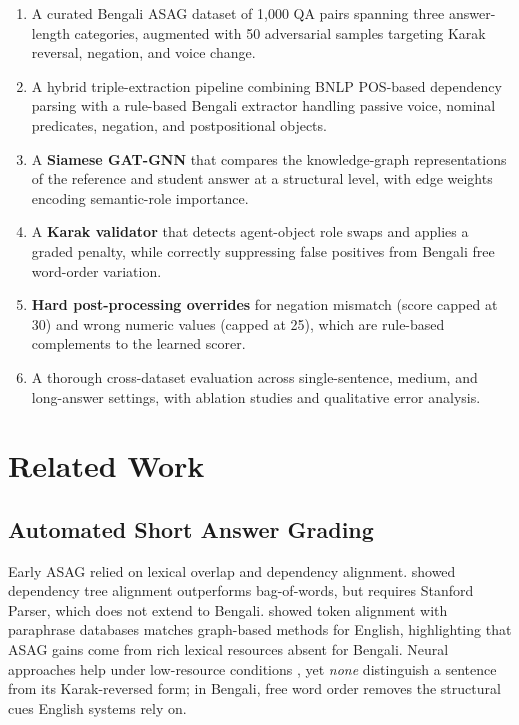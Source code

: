\documentclass[11pt]{article}
\begin{document}
\begin{enumerate}
  \item A curated Bengali ASAG dataset of 1{,}000 QA pairs spanning three answer-length categories, augmented with 50 adversarial samples targeting Karak reversal, negation, and voice change.
  \item A hybrid triple-extraction pipeline combining BNLP POS-based dependency parsing with a rule-based Bengali extractor handling passive voice, nominal predicates, negation, and postpositional objects.
  \item A \textbf{Siamese GAT-GNN} that compares the knowledge-graph representations of the reference and student answer at a structural level, with edge weights encoding semantic-role importance.
  \item A \textbf{Karak validator} that detects agent-object role swaps and applies a graded penalty, while correctly suppressing false positives from Bengali free word-order variation.
  \item \textbf{Hard post-processing overrides} for negation mismatch (score capped at 30) and wrong numeric values (capped at 25), which are rule-based complements to the learned scorer.
  \item A thorough cross-dataset evaluation across single-sentence, medium, and long-answer settings, with ablation studies and qualitative error analysis.
\end{enumerate}

\section{Related Work}

\subsection{Automated Short Answer Grading}

Early ASAG relied on lexical overlap and dependency alignment. \citet{mohler2011learning} showed dependency tree alignment outperforms bag-of-words, but requires Stanford Parser, which does not extend to Bengali. \citet{sultan2016fast} showed token alignment with paraphrase databases matches graph-based methods for English, highlighting that ASAG gains come from rich lexical resources absent for Bengali. Neural approaches help under low-resource conditions \citep{riordan2017investigating, horbach2017finding}, yet \emph{none} distinguish a sentence from its Karak-reversed form; in Bengali, free word order removes the structural cues English systems rely on.
\end{document}
